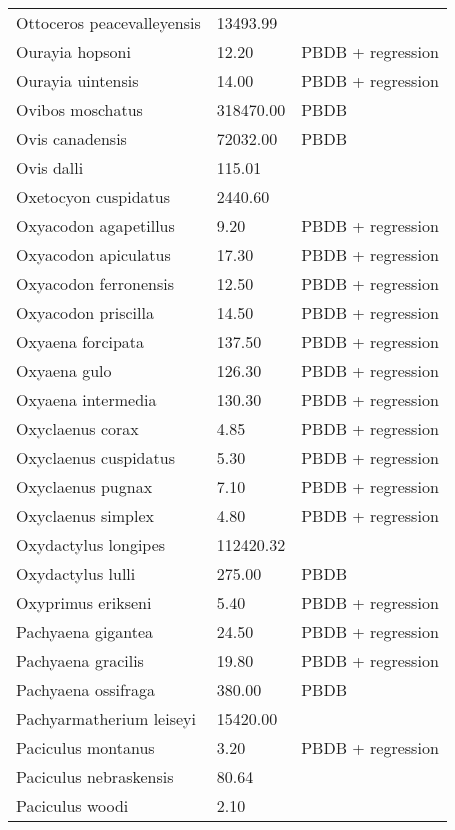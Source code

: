 \begin{longtable}{p{} p{} p{}}
    Ottoceros peacevalleyensis & 13493.99 & \cite{Tomiya2013} \\ 
    Ourayia hopsoni & 12.20 & PBDB + regression \\ 
    Ourayia uintensis & 14.00 & PBDB + regression \\ 
    Ovibos moschatus & 318470.00 & PBDB \\ 
    Ovis canadensis & 72032.00 & PBDB \\ 
    Ovis dalli & 115.01 & \cite{Smith2004} \\ 
    Oxetocyon cuspidatus & 2440.60 & \cite{Tomiya2013} \\ 
    Oxyacodon agapetillus & 9.20 & PBDB + regression \\ 
    Oxyacodon apiculatus & 17.30 & PBDB + regression \\ 
    Oxyacodon ferronensis & 12.50 & PBDB + regression \\ 
    Oxyacodon priscilla & 14.50 & PBDB + regression \\ 
    Oxyaena forcipata & 137.50 & PBDB + regression \\ 
    Oxyaena gulo & 126.30 & PBDB + regression \\ 
    Oxyaena intermedia & 130.30 & PBDB + regression \\ 
    Oxyclaenus corax & 4.85 & PBDB + regression \\ 
    Oxyclaenus cuspidatus & 5.30 & PBDB + regression \\ 
    Oxyclaenus pugnax & 7.10 & PBDB + regression \\ 
    Oxyclaenus simplex & 4.80 & PBDB + regression \\ 
    Oxydactylus longipes & 112420.32 & \cite{Tomiya2013} \\ 
    Oxydactylus lulli & 275.00 & PBDB \\ 
    Oxyprimus erikseni & 5.40 & PBDB + regression \\ 
    Pachyaena gigantea & 24.50 & PBDB + regression \\ 
    Pachyaena gracilis & 19.80 & PBDB + regression \\ 
    Pachyaena ossifraga & 380.00 & PBDB \\ 
    Pachyarmatherium leiseyi & 15420.00 & \cite{McDonald1995} \\ 
    Paciculus montanus & 3.20 & PBDB + regression \\ 
    Paciculus nebraskensis & 80.64 & \cite{Tomiya2013} \\ 
    Paciculus woodi & 2.10 & \cite{Korth1993} \\ 

\end{longtable}
